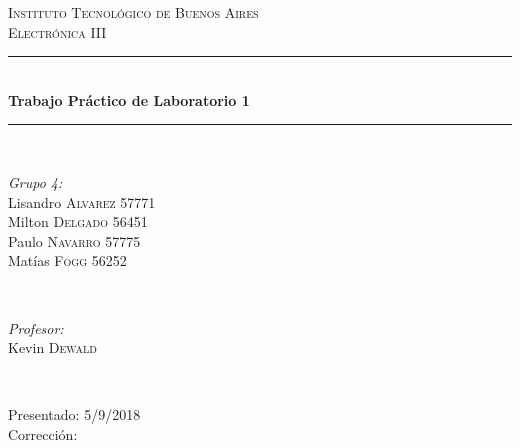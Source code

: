 \begin{titlepage}
\newcommand{\HRule}{\rule{\linewidth}{0.5mm}}
\center
\textsc{\LARGE Instituto Tecnológico de Buenos Aires}\\[1.5cm]
\textsc{\Large Electrónica III}\\[0.5cm]

\HRule \\[0.4cm]
{ \huge \bfseries Trabajo Práctico de Laboratorio 1}\\[0.4cm] %
\HRule \\[1.5cm]

\begin{minipage}{0.4\textwidth}
\begin{flushleft} \large
\emph{Grupo 4:}\\
Lisandro \textsc{Alvarez} 57771\\
Milton \textsc{Delgado} 56451\\
Paulo \textsc{Navarro} 57775\\
Matías \textsc{Fogg} 56252\\
\end{flushleft}
\end{minipage}
~
\begin{minipage}{0.4\textwidth}
\begin{flushright} \large
\emph{Profesor:} \\
Kevin \textsc{Dewald}\\
\end{flushright}
\end{minipage}\\[4cm]

\begin{minipage}{0.4\textwidth}
\begin{flushleft} \large
Presentado: 5/9/2018\\
Corrección:\\
\end{flushleft}
\end{minipage}
\vfill %

\end{titlepage}


\maketitle










